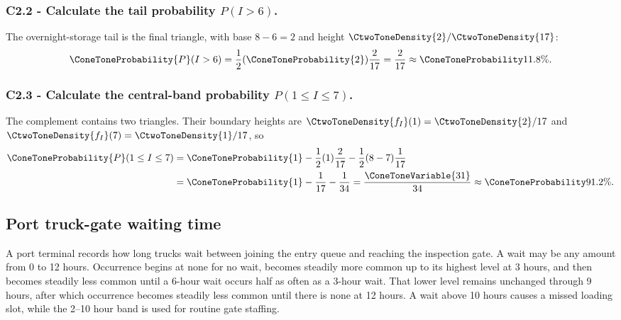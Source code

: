 \subsubsection*{C2.2 - Calculate the tail probability $P(I>6)$.}
\label{subsec:c2-piecewise-linear-inspection-b}
The overnight-storage tail is the final triangle, with base $8-6=2$ and height
$\CtwoToneDensity{2}/\CtwoToneDensity{17}$:
\[
 \ConeToneProbability{P}(I>6)=\frac12(\ConeToneProbability{2})\frac2{17}=\frac2{17}\approx\ConeToneProbability{11.8\%}.
\]

\subsubsection*{C2.3 - Calculate the central-band probability
$P(1\le I\le7)$.}
\label{subsec:c2-piecewise-linear-inspection-c}
The complement contains two triangles.  Their boundary heights are
$\CtwoToneDensity{f_I}(1)=\CtwoToneDensity{2}/17$ and $\CtwoToneDensity{f_I}(7)=\CtwoToneDensity{1}/17$, so
\[
 \begin{aligned}
 \ConeToneProbability{P}(1\le I\le7)
 &=\ConeToneProbability{1}-\frac12(1)\frac2{17}-\frac12(8-7)\frac1{17}\\
 &=\ConeToneProbability{1}-\frac1{17}-\frac1{34}=\frac{\ConeToneVariable{31}}{34}\approx\ConeToneProbability{91.2\%}.
 \end{aligned}
\]

\subsection{Port truck-gate waiting time}\label{sec:c2-piecewise-linear-gate}
A port terminal records how long trucks wait between joining the entry queue
and reaching the inspection gate.  A wait may be any amount from 0 to 12
hours.  Occurrence begins at none for no wait, becomes steadily more
common up to its highest level at 3 hours, and then becomes steadily less common
until a 6-hour wait occurs half as often as a 3-hour wait.  That lower level
remains unchanged through 9 hours, after which occurrence becomes steadily less
common until there is none at 12 hours.  A wait above 10 hours causes
a missed loading slot, while the 2--10 hour band is used for routine gate
staffing.

\begingroup{}
\endgroup

